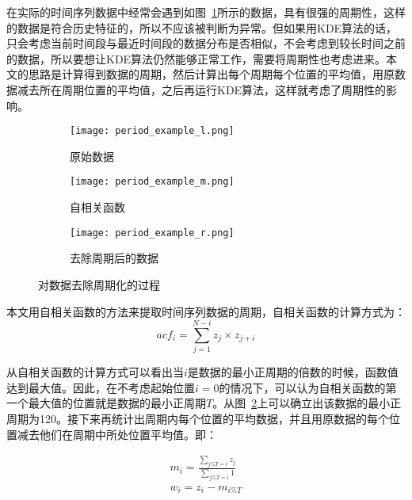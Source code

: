 在实际的时间序列数据中经常会遇到如图~\ref{fig:period:left}所示的数据，具有很强的周期性，这样的数据是符合历史特征的，所以不应该被判断为异常。但如果用KDE算法的话，只会考虑当前时间段与最近时间段的数据分布是否相似，不会考虑到较长时间之前的数据，所以要想让KDE算法仍然能够正常工作，需要将周期性也考虑进来。本文的思路是计算得到数据的周期，然后计算出每个周期每个位置的平均值，用原数据减去所在周期位置的平均值，之后再运行KDE算法，这样就考虑了周期性的影响。
\begin{figure}[htbp]
  \begin{subfigure}[b]{0.335\textwidth}
    \begin{minipage}[t]{\linewidth}
    \centering
    \texttt{[image: period\_example\_l.png]}
    \caption{原始数据}
    \label{fig:period:left}
    \end{minipage}
  \end{subfigure}
  \begin{subfigure}[b]{0.325\textwidth}
    \begin{minipage}[t]{\linewidth}
    \centering
    \texttt{[image: period\_example\_m.png]}
    \caption{自相关函数}
    \label{fig:period:middle}
    \end{minipage}
  \end{subfigure}
  \begin{subfigure}[b]{0.325\textwidth}
    \begin{minipage}[t]{\linewidth}
      \centering
      \texttt{[image: period\_example\_r.png]}
      \caption{去除周期后的数据}
      \label{fig:period:right}
      \end{minipage}
    \end{subfigure}
    \caption{对数据去除周期化的过程}
    \label{fig:period}
\end{figure}

本文用自相关函数的方法来提取时间序列数据的周期\cite{rabiner1977use}，自相关函数的计算方式为：
\begin{equation*}
  acf_i = \sum_{j=1}^{N-i}z_j\times z_{j+i}
\end{equation*}

从自相关函数的计算方式可以看出当$i$是数据的最小正周期的倍数的时候，函数值达到最大值。因此，在不考虑起始位置$i=0$的情况下，可以认为自相关函数的第一个最大值的位置就是数据的最小正周期$T$。从图~\ref{fig:period:middle}上可以确立出该数据的最小正周期为120。接下来再统计出周期内每个位置的平均数据，并且用原数据的每个位置减去他们在周期中所处位置平均值。即：

\begin{equation*}
  \begin{aligned}
  m_i = \frac{\sum\limits_{j\%T = i}z_j}{\sum\limits_{j\%T = i}1}\\
  w_i = z_i - m_{i\%T}
  \end{aligned}
\end{equation*}

